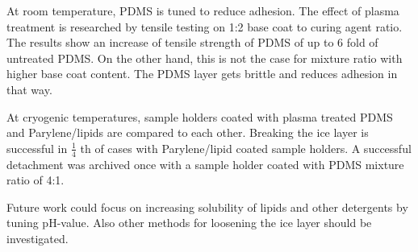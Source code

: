 At room temperature, PDMS is tuned to reduce adhesion. The effect of plasma treatment is researched by tensile testing on 1:2 base coat to curing agent ratio. The results show an increase of tensile strength of PDMS of up to 6 fold of untreated PDMS. On the other hand, this is not the case for mixture ratio with higher base coat content. The PDMS layer gets brittle and reduces adhesion in that way.

At cryogenic temperatures, sample holders coated with plasma treated PDMS and Parylene/lipids are compared to each other. Breaking the ice layer is successful in $\frac{1}{4}$ th of cases with Parylene/lipid coated sample holders. A successful detachment was archived once with a sample holder coated with PDMS mixture ratio of 4:1.

Future work could focus on increasing solubility of lipids and other detergents by tuning pH-value. Also other methods for loosening the ice layer should be investigated. 

